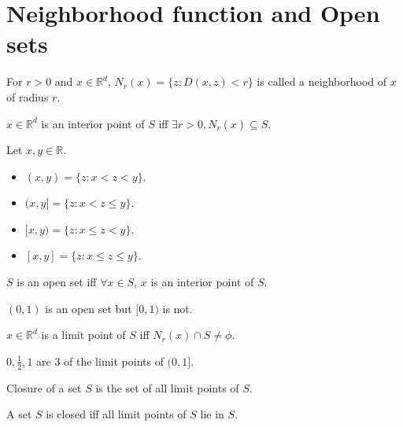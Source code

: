 \section{Neighborhood function and Open sets}

\begin{definition} For $r > 0$ and $x \in \mathbb{R}^d$, $N_r(x) = \{z: D(x, z) < r\}$
is called a neighborhood of $x$ of radius $r$. \end{definition}

\begin{definition} $x \in \mathbb{R}^d$ is an interior point of $S$ iff
$\exists r > 0, N_r(x) \subseteq S$. \end{definition}

\begin{definition}Let $x, y \in \mathbb{R}$.\begin{itemize}
\item $(x, y) = \{z: x < z < y\}$.
\item $(x, y] = \{z: x < z \le y\}$.
\item $[x, y) = \{z: x \le z < y\}$.
\item $[x, y] = \{z: x \le z \le y\}$.
\end{itemize}\end{definition}

\begin{definition} $S$ is an open set iff $\forall x \in S$,
$x$ is an interior point of $S$. \end{definition}

\begin{example} $(0, 1)$ is an open set but $[0, 1)$ is not. \end{example}

\begin{definition} $x \in \mathbb{R}^d$ is a limit point of $S$ iff
$N_r(x) \cap S \neq \phi$. \end{definition}

\begin{example} $0, \frac{1}{2}, 1$ are 3 of the limit points of $(0, 1]$. \end{example}

\begin{definition} Closure of a set $S$ is the set of all limit points of $S$. \end{definition}

\begin{definition} A set $S$ is closed iff all limit points of $S$ lie in $S$. \end{definition}

